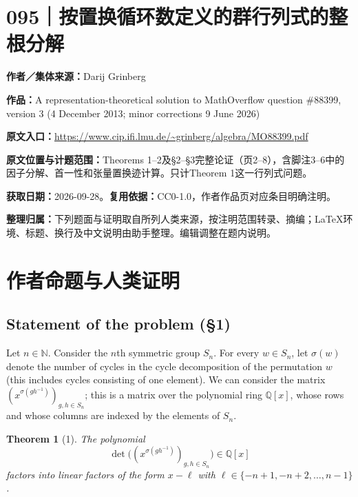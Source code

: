 \documentclass[UTF8,11pt,a4paper]{ctexart}
\newtheorem*{theorem}{Theorem}
\theoremstyle{definition}\newtheorem*{definition}{Definition}
\theoremstyle{remark}\newtheorem*{remark}{Remark}
\newcommand{\Q}{\mathbb Q}
\newcommand{\N}{\mathbb N}
\begin{document}
\section*{095｜按置换循环数定义的群行列式的整根分解}
\textbf{作者／集体来源：}Darij Grinberg

\textbf{作品：}A representation-theoretical solution to MathOverflow question \#88399, version 3 (4 December 2013; minor corrections 9 June 2026)

\textbf{原文入口：}\url{https://www.cip.ifi.lmu.de/~grinberg/algebra/MO88399.pdf}

\textbf{原文位置与计题范围：}Theorems 1--2及§2--§3完整论证（页2--8），含脚注3--6中的因子分解、首一性和张量置换迹计算。只计Theorem 1这一行列式问题。

\textbf{获取日期：}2026-09-28。\quad\textbf{复用依据：}CC0-1.0，作者作品页对应条目明确注明。

\textbf{整理归属：}下列题面与证明取自所列人类来源，按注明范围转录、摘编；LaTeX环境、标题、换行及中文说明由助手整理。编辑调整在题内说明。

\section*{作者命题与人类证明}

\subsection*{Statement of the problem (\S1)}
Let $n\in\N$. Consider the $n$th symmetric group $S_n$. For every $w\in S_n$, let $\sigma(w)$ denote the number of cycles in the cycle decomposition of the permutation $w$ (this includes cycles consisting of one element). We can consider the matrix $(x^{\sigma(gh^{-1})})_{g,h\in S_n}$; this is a matrix over the polynomial ring $\Q[x]$, whose rows and whose columns are indexed by the elements of $S_n$.
\begin{theorem}[1]
The polynomial
\[
\det\bigl((x^{\sigma(gh^{-1})})_{g,h\in S_n}\bigr)\in\Q[x]
\]
factors into linear factors of the form $x-\ell$ with $\ell\in\{-n+1,-n+2,\ldots,n-1\}$.
\end{theorem}
\end{document}
